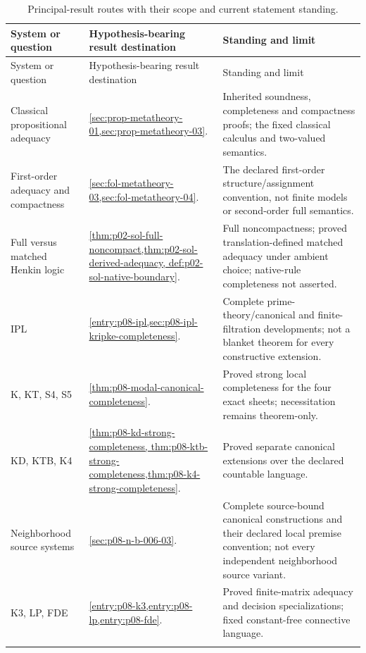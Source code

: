 \begin{longtable}{@{}p{}p{}p{}@{}}
\caption{Principal-result routes with their scope and current statement standing.}
\label{tab:p14-directory-results}\\
\toprule
System or question & Hypothesis-bearing result destination & Standing and limit\\
\midrule
\endfirsthead
\toprule
System or question & Hypothesis-bearing result destination & Standing and limit\\
\midrule
\endhead
\bottomrule
\endfoot
Classical propositional adequacy &
\cref{sec:prop-metatheory-01,sec:prop-metatheory-03}. & Inherited
soundness, completeness and compactness proofs; the fixed classical
calculus and two-valued semantics.\\\addlinespace
First-order adequacy and compactness &
\cref{sec:fol-metatheory-03,sec:fol-metatheory-04}. & The declared first-order
structure/assignment convention, not finite models or second-order full
semantics.\\\addlinespace
Full versus matched Henkin logic &
\cref{thm:p02-sol-full-noncompact,thm:p02-sol-derived-adequacy,
def:p02-sol-native-boundary}. & Full noncompactness; proved
translation-defined matched adequacy under ambient choice; native-rule
completeness not asserted.\\\addlinespace
IPL & \cref{entry:p08-ipl,sec:p08-ipl-kripke-completeness}. & Complete
prime-theory/canonical and finite-filtration developments; not a blanket
theorem for every constructive extension.\\\addlinespace
K, KT, S4, S5 & \cref{thm:p08-modal-canonical-completeness}. & Proved
strong local completeness for the four exact sheets; necessitation
remains theorem-only.\\\addlinespace
KD, KTB, K4 & \cref{thm:p08-kd-strong-completeness,
thm:p08-ktb-strong-completeness,thm:p08-k4-strong-completeness}. & Proved
separate canonical extensions over the declared countable language.\\\addlinespace
Neighborhood source systems & \cref{sec:p08-n-b-006-03}. & Complete
source-bound canonical constructions and their declared local premise
convention; not every independent neighborhood source variant.\\\addlinespace
K3, LP, FDE & \cref{entry:p08-k3,entry:p08-lp,entry:p08-fde}. & Proved
finite-matrix adequacy and decision specializations; fixed
constant-free connective language.\\\addlinespace

\end{longtable}
